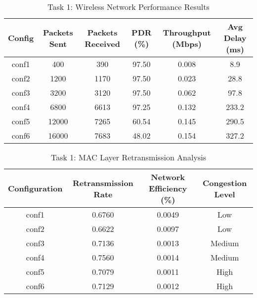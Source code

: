 \documentclass{article}
\begin{document}
\begin{table}[H]

\centering

\caption{Task 1: Wireless Network Performance Results}

\begin{tabular}{|c|c|c|c|c|c|}

\hline

Config & Packets Sent & Packets Received & PDR (\%) & Throughput (Mbps) & Avg Delay (ms) \\

\hline

conf1 & 400 & 390 & 97.50 & 0.008 & 8.9 \\

conf2 & 1200 & 1170 & 97.50 & 0.023 & 28.8 \\

conf3 & 3200 & 3120 & 97.50 & 0.062 & 97.8 \\

conf4 & 6800 & 6613 & 97.25 & 0.132 & 233.2 \\

conf5 & 12000 & 7265 & 60.54 & 0.145 & 290.5 \\

conf6 & 16000 & 7683 & 48.02 & 0.154 & 327.2 \\

\hline

\end{tabular}

\end{table}

\begin{table}[H]

\centering

\caption{Task 1: MAC Layer Retransmission Analysis}

\begin{tabular}{|c|c|c|c|}

\hline

Configuration & Retransmission Rate & Network Efficiency (\%) & Congestion Level \\

\hline

conf1 & 0.6760 & 0.0049 & Low \\

conf2 & 0.6622 & 0.0097 & Low \\

conf3 & 0.7136 & 0.0013 & Medium \\

conf4 & 0.7560 & 0.0014 & Medium \\

conf5 & 0.7079 & 0.0011 & High \\

conf6 & 0.7129 & 0.0012 & High \\

\hline

\end{tabular}

\end{table}
\end{document}
